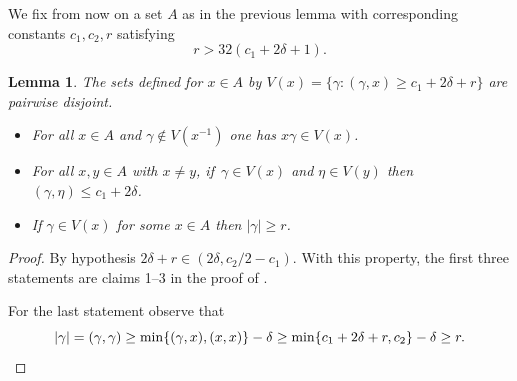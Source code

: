\documentclass[JEP,XML,SOM,Unicode,NoEqCountersInSection,published]{cedram}
\newtheorem{lemma}[theorem]{Lemma}
\begin{document}
We fix from now on a set \(A\) as in the previous lemma with corresponding constants \(c_1,c_2,r\) satisfying
\begin{equation}\label{requation}
r > 32(c_1+2\delta+1).
\end{equation}

\begin{lemma}\label{borrowedlemma}
The sets defined for \(x \in A\) by \(V(x) = \lbrace \gamma: (\gamma,x) \ge c_1+2\delta + r\rbrace\) are pairwise disjoint.

\begin{itemize}
\item
For all \(x \in A\) and \(\gamma \notin V(x^{-1})\) one has \(x\gamma \in V(x)\).

\item
For all \(x,y \in A\) with \(x \neq y\), if~\(\gamma \in V(x)\) and \(\eta \in V(y)\) then \((\gamma,\eta) \le c_1+2\delta\).

\item
If \(\gamma \in V(x)\) for some \(x \in A\) then \(|\gamma| \ge r\).
\end{itemize}
\end{lemma}
\begin{proof}
By hypothesis \(2\delta + r \in (2\delta,c_2/2 - c_1)\). With this property, the first three statements are claims 1--3 in the proof of \cite[Lem.\,4.1]{random}.

For the last statement observe that
\[
|\gamma| = (\gamma,\gamma) \ge \min\lbrace (\gamma,x),(x,x)\rbrace - \delta \ge \min \lbrace c_1 + 2\delta + r, c_2\rbrace - \delta \ge r.\qedhere
\]
\end{proof}
\end{document}

